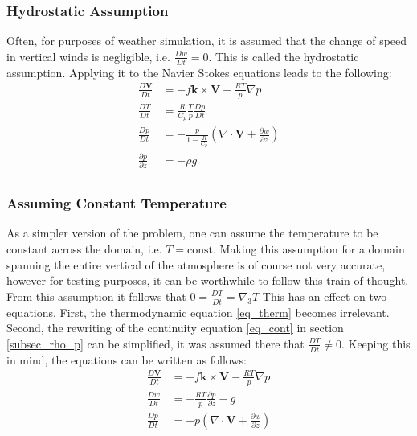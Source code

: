 \subsubsection{Hydrostatic Assumption}\label{subsec_hydrostat}
Often, for purposes of weather simulation, it is assumed that the change of speed in vertical winds is negligible, i.e. $\frac{Dw}{Dt}=0$.
This is called the hydrostatic assumption.
Applying it to the Navier Stokes equations leads to the following:
\begin{align*}
\frac{D\textbf{V}}{Dt} &= -f\boldsymbol{k} \times \textbf{V} - \frac{RT}{p}\nabla p\\
\frac{DT}{Dt} &= \frac{R}{C_p}\frac{T}{p}\frac{Dp}{Dt}\\
\frac{Dp}{Dt} &= -\frac{p}{1- \frac{R}{C_p}} (\nabla \cdot \textbf{V} + \frac{\partial w}{\partial z})\\
\frac{\partial p}{\partial z} &= -\rho g \\
\end{align*}



\subsubsection{Assuming Constant Temperature}
As a simpler version of the problem, one can assume the temperature to be constant across the domain, i.e. $T=\text{const}$.
Making this assumption for a domain spanning the entire vertical of the atmosphere is of course not very accurate, however for testing purposes, it can be worthwhile to follow this train of thought.
From this assumption it follows that $0=\frac{DT}{Dt}=\nabla _3T$
This has an effect on two equations.
First, the thermodynamic equation \ref{eq_therm} becomes irrelevant.
Second, the rewriting of the continuity equation \ref{eq_cont} in section \ref{subsec_rho_p} can be simplified, it was assumed there that $\frac{DT}{Dt}\neq 0$.
Keeping this in mind, the equations can be written as follows:
\begin{align*}
\frac{D\textbf{V}}{Dt} &= -f\boldsymbol{k} \times \textbf{V} - \frac{RT}{p}\nabla p\\
\frac{Dw}{Dt} &= - \frac{RT}{p} \frac{\partial p}{\partial z} - g \\
\frac{Dp}{Dt} &= -p (\nabla \cdot \textbf{V} + \frac{\partial w}{\partial z})
\end{align*}

